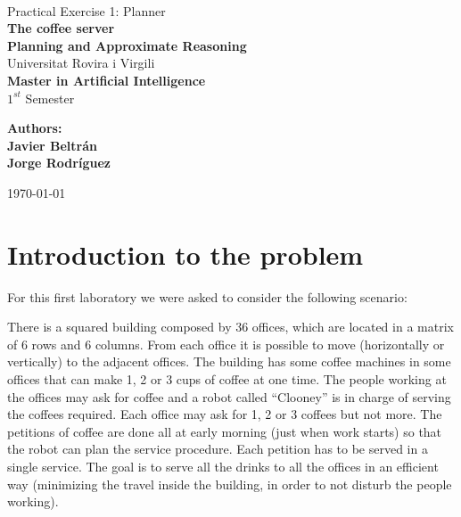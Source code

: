 \documentclass[12pt,a4paper,oneside]{article}
\date{\today}
\numberwithin{equation}{section}
\numberwithin{equation}{section}
\theoremstyle{definition}
\begin{document}
\begin{center}
	\textbf{ }\\[4cm]
	
	\LARGE Practical Exercise 1: Planner\\[0.5cm]
	\textbf{{\Huge The coffee server}}\\[0.5cm]
	\textbf{{\LARGE Planning and Approximate Reasoning}}\\[1.5cm]
	
	{\Large Universitat Rovira i Virgili}\\[2.3cm]
	{\LARGE \textbf{Master in Artificial Intelligence}}\\[0.5cm]
	{\LARGE $1^{st}$ Semester}\\[2.5cm]
	
	\begin{flushright}
		\textbf{\large{Authors:}\\ \normalsize{Javier Beltr\'an\\Jorge Rodr\'iguez\\}}
	\end{flushright}
	\today
\end{center}
\thispagestyle{empty} 
\pagebreak

\section{Introduction to the problem}

For this first laboratory we were asked to consider the following scenario:

There is a squared building composed by 36 offices, which are located in a matrix of 6 rows and 6 columns. From each office it is possible to move (horizontally or vertically) to the adjacent offices. The building has some coffee machines in some offices that can make 1, 2 or 3 cups of coffee at one time.
The people working at the offices may ask for coffee and a robot called “Clooney” is in charge of serving the coffees required. Each office may ask for 1, 2 or 3 coffees but not more. The petitions of coffee are done all at early morning (just when work starts) so that the robot can plan the service procedure. Each petition has to be served in a single service.
The goal is to serve all the drinks to all the offices in an efficient way (minimizing the travel inside the building, in order to not disturb the people working).
\end{document}

